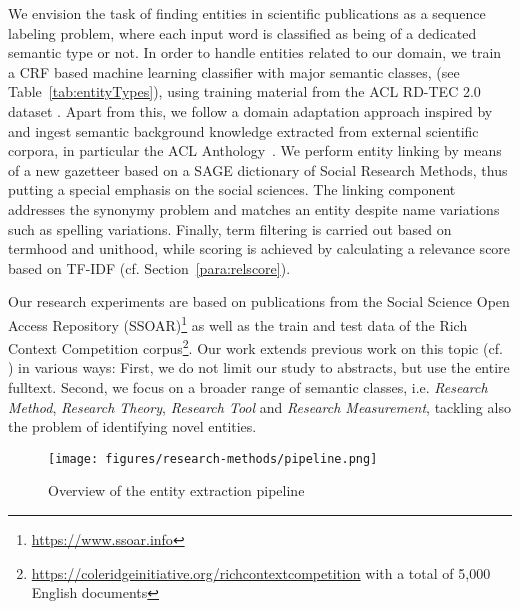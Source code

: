 We envision the task of finding entities in scientific publications as a sequence labeling problem, 
where each input word is classified as being of a dedicated semantic type or not.
In order to handle entities related to our domain, we train a CRF based machine learning classifier with major semantic classes,
(see Table~\ref{tab:entityTypes}), 
using training material from the ACL RD-TEC 2.0 dataset \cite{qasemizadeh2016acl}.
Apart from this, we follow a domain adaptation approach inspired by \cite{agerri2016robust} and ingest semantic background knowledge extracted from external scientific corpora, in particular the ACL Anthology~\cite{bird2008acl,gildea2018acl}.
We perform entity linking by means of a new gazetteer based on a SAGE dictionary of Social Research Methods\cite{lewis2003sage}, thus putting a special emphasis on the social sciences. 
The linking component addresses the synonymy problem and matches an entity despite name variations such as spelling variations. 
Finally, term filtering is carried out based on termhood and unithood, while scoring is achieved by calculating a relevance score based on TF-IDF (cf. Section~\ref{para:relscore}).

Our research experiments are based on publications from the Social Science Open Access Repository (SSOAR)\footnote{\url{https://www.ssoar.info}} as well as the train and test data of the Rich Context Competition corpus\footnote{\url{https://coleridgeinitiative.org/richcontextcompetition}
with a total of 5,000 English documents}.
Our work extends previous work on this topic (cf. \cite{eckle2013automatically}) in various ways: First, we do not limit our study to abstracts, but use the entire fulltext. Second, we focus on a broader range of semantic classes, 
i.e. \textit{Research Method}, \textit{Research Theory}, \textit{Research Tool} and \textit{Research Measurement}, tackling also the problem of identifying novel entities.
 


\begin{figure}[t]
\centering
    \texttt{[image: figures/research-methods/pipeline.png]}
    \caption{Overview of the entity extraction pipeline}
\label{fig:pipeline}
\end{figure}


